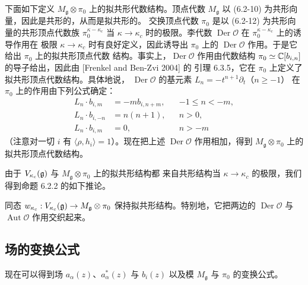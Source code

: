 下面如下定义 $M_{\mathfrak g}\otimes\pi_0$ 上的拟共形代数结构。顶点代数
$M_{\mathfrak g}$ 以 (6.2-10) 为共形向量，因此是共形的，从而是拟共形的。
交换顶点代数 $\pi_0$ 是以 (6.2-12) 为共形向量的共形顶点代数族
$\pi_0^{\kappa-\kappa_c}$ 当 $\kappa\to\kappa_c$ 时的极限。李代数
$\operatorname{Der}\mathcal O$ 在 $\pi_0^{\kappa-\kappa_c}$ 上的诱导作用在
极限 $\kappa\to\kappa_c$ 时有良好定义，因此诱导出 $\pi_0$ 上的
$\operatorname{Der}\mathcal O$ 作用。于是它给出 $\pi_0$ 上的拟共形顶点代数
结构。事实上，$\operatorname{Der}\mathcal O$ 作用由代数结构
$\pi_0\simeq\mathbb{C}[b_{i,n}]$ 的导子给出，因此由 [Frenkel and Ben-Zvi 2004] 的
引理 6.3.5，它在 $\pi_0$ 上定义了拟共形顶点代数结构。具体地说，
$\operatorname{Der}\mathcal O$ 的基元素 $L_n=-t^{n+1}\partial_t$（$n\ge-1$）
在 $\pi_0$ 上的作用由下列公式确定：
\begin{equation}
    \begin{aligned}
        L_n\cdot b_{i,m}&=-mb_{i,n+m}, & &-1\le n<-m,\\
        L_n\cdot b_{i,-n}&=n(n+1), & &n>0,\\
        L_n\cdot b_{i,m}&=0, & &n>-m
    \end{aligned}
    \tag{6.2-13}
\end{equation}
（注意对一切 $i$ 有 $\langle\rho,h_i\rangle=1$）。现在把上述
$\operatorname{Der}\mathcal O$ 作用相加，得到 $M_{\mathfrak g}\otimes\pi_0$
上的拟共形顶点代数结构。

由于 $V_{\kappa_c}(\mathfrak{g})$ 与 $M_{\mathfrak g}\otimes\pi_0$ 上的拟共形结构都
来自共形结构当 $\kappa\to\kappa_c$ 的极限，我们得到命题 6.2.2 的如下推论。

\renewcommand{\thecorollary}{6.2.3}
\begin{corollary}
    同态 $w_{\kappa_c}:V_{\kappa_c}(\mathfrak{g})\to M_{\mathfrak g}\otimes\pi_0$
    保持拟共形结构。特别地，它把两边的 $\operatorname{Der}\mathcal O$ 与
    $\operatorname{Aut}\mathcal O$ 作用交织起来。
\end{corollary}

\subsection{场的变换公式}

现在可以得到场 $a_\alpha(z)$、$a^*_\alpha(z)$ 与 $b_i(z)$ 以及模
$M_{\mathfrak g}$ 与 $\pi_0$ 的变换公式。

